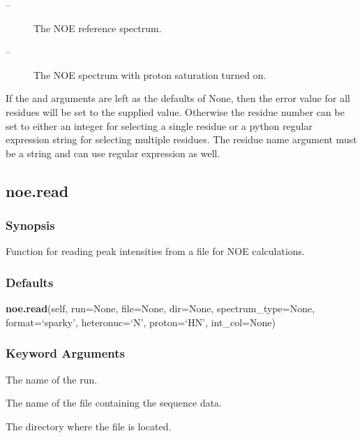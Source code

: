  \begin{description} 
 \item[ --]  The NOE reference spectrum.  
 \item[ --]  The NOE spectrum with proton saturation turned on.  
 \end{description} 
  

 If the  and  arguments are left as the defaults of None, then the error value for all residues will be set to the supplied value.  Otherwise the residue number can be set to either an integer for selecting a single residue or a python regular expression string for selecting multiple residues.  The residue name argument must be a string and can use regular expression as well. 
  

  

 \newpage 

 \subsection{noe.read} 

  
 \subsubsection{Synopsis} 

 Function for reading peak intensities from a file for NOE calculations. 
  

  
 \subsubsection{Defaults} 

 \textsf{\textbf{noe.read}(self, run=None, file=None, dir=None, spectrum\_type=None, format=`sparky', heteronuc=`N', proton=`HN', int\_col=None)} 

  
 \subsubsection{Keyword Arguments} 

   The name of the run.   

   The name of the file containing the sequence data.   

   The directory where the file is located.   

